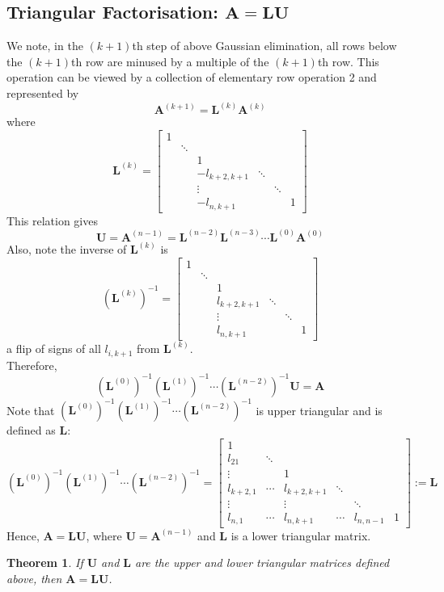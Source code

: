\documentclass[12pt]{article}
\newtheorem{theorem}{Theorem}[section]
\theoremstyle{definition}
\begin{document}
\subsection{Triangular Factorisation: $\mathbf{A}=\mathbf{LU}$}
We note, in the $(k+1)$th step of above Gaussian elimination, all rows below the $(k+1)$th row are minused by a multiple of the $(k+1)$th row. This operation can be viewed by a collection of elementary row operation 2 and represented by
\[
\mathbf{A}^{(k+1)}=\mathbf{L}^{(k)}\mathbf{A}^{(k)}
\]
where
\[
\mathbf{L}^{(k)}=\begin{bmatrix}
1& & & & &\\
 &\ddots&&&&\\
 &&1&&&\\
&&-l_{k+2,k+1}&\ddots&&\\
&&\vdots&&\ddots&\\
&&-l_{n,k+1}&&&1
\end{bmatrix}
\]
This relation gives
\[
\mathbf{U}=\mathbf{A}^{(n-1)}=\mathbf{L}^{(n-2)}\mathbf{L}^{(n-3)}\cdots\mathbf{L}^{(0)}\mathbf{A}^{(0)}
\]
Also, note the inverse of $\mathbf{L}^{(k)}$ is
\[
(\mathbf{L}^{(k)})^{-1}=\begin{bmatrix}
1& & & & &\\
 &\ddots&&&&\\
 &&1&&&\\
&&l_{k+2,k+1}&\ddots&&\\
&&\vdots&&\ddots&\\
&&l_{n,k+1}&&&1
\end{bmatrix}
\]
a flip of signs of all $l_{i,k+1}$ from $\mathbf{L}^{(k)}$.\\
Therefore,
\[
(\mathbf{L}^{(0)})^{-1}(\mathbf{L}^{(1)})^{-1}\cdots (\mathbf{L}^{(n-2)})^{-1} \mathbf{U}=\mathbf{A}
\]
Note that $(\mathbf{L}^{(0)})^{-1}(\mathbf{L}^{(1)})^{-1}\cdots (\mathbf{L}^{(n-2)})^{-1}$ is upper triangular and is defined as $\mathbf{L}$:
\[
(\mathbf{L}^{(0)})^{-1}(\mathbf{L}^{(1)})^{-1}\cdots (\mathbf{L}^{(n-2)})^{-1}=\begin{bmatrix}
1&&&&&\\
l_{21}&\ddots&&&&\\
\vdots&&1&&&\\
l_{k+2,1}&\cdots&l_{k+2,k+1}&\ddots&&\\
\vdots&&\vdots&&\ddots&\\
l_{n,1}&\cdots&l_{n,k+1}&\cdots&l_{n,n-1}&1
\end{bmatrix}:=\mathbf{L}
\]
Hence, $\mathbf{A}=\mathbf{L}\mathbf{U}$, where $\mathbf{U}=\mathbf{A}^{(n-1)}$ and $\mathbf{L}$ is a lower triangular matrix.
\begin{theorem}\normalfont If $\mathbf{U}$ and $\mathbf{L}$ are the upper and lower triangular matrices defined above, then $\mathbf{A}=\mathbf{L}\mathbf{U}$.
\end{theorem}
\end{document}
